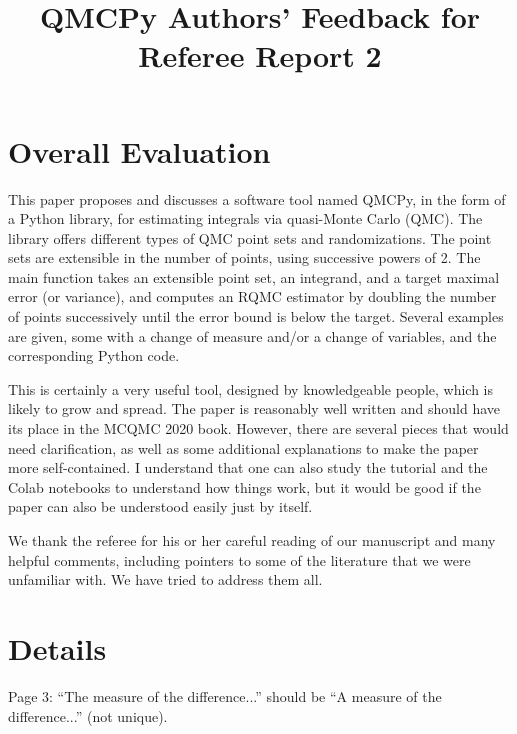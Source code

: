 \documentclass{amsart}
\begin{document}
\title{QMCPy Authors' Feedback for Referee Report 2}

\newcommand{\AGSComment}[1]{{\color{blue} #1}}
\newcommand{\FJHComment}[1]{{\color{blue} #1}}

\maketitle


\section{Overall Evaluation}

This paper proposes and discusses a software tool named QMCPy, in the form of a Python library, for estimating integrals via quasi-Monte Carlo (QMC). The library offers different types of QMC point sets and randomizations. The point sets are extensible in the number of points, using successive powers of 2. The main function takes an extensible point set, an integrand, and a target maximal error (or variance), and computes an RQMC estimator by doubling the number of points successively until the error bound is below the target. Several examples are given, some with a change of measure and/or a change of variables, and the corresponding Python code.

This is certainly a very useful tool, designed by knowledgeable people, which is likely to grow and spread. The paper is reasonably well written and should have its place in the MCQMC 2020 book. However, there are several pieces that would need clarification, as well as some additional explanations to make the paper more self-contained. I understand that one can also study the tutorial and the Colab notebooks to understand how things work, but it would be good if the paper can also be understood easily just by itself.

\bigskip

\FJHComment{We thank the referee for his or her careful reading of our manuscript and many helpful comments, including pointers to some of the literature that we were unfamiliar with.  We have tried to address them all.}

\section{Details}

Page 3: ``The measure of the difference...'' should be ``A measure of the difference...'' (not
unique).
\end{document}
